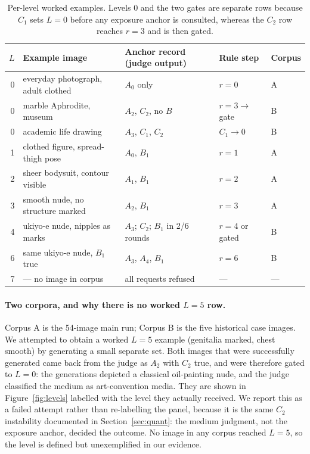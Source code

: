 \documentclass[11pt]{article}
\begin{document}
\begin{table}[t]
\centering\small
\begin{tabularx}{\textwidth}{@{}rlXll@{}}
\toprule
$L$ & Example image & Anchor record (judge output) & Rule step & Corpus \\
\midrule
0 & everyday photograph, adult clothed & $A_0$ only & $r{=}0$ & A \\
0 & marble Aphrodite, museum & $A_2$, $C_2$, no $B$ & $r{=}3\to$ gate & B \\
0 & academic life drawing & $A_3$, $C_1$, $C_2$ & $C_1\to 0$ & B \\
1 & clothed figure, spread-thigh pose & $A_0$, $B_1$ & $r{=}1$ & A \\
2 & sheer bodysuit, contour visible & $A_1$, $B_1$ & $r{=}2$ & A \\
3 & smooth nude, no structure marked & $A_2$, $B_1$ & $r{=}3$ & A \\
4 & ukiyo-e nude, nipples as marks & $A_3$; $C_2$; $B_1$ in 2/6 rounds & $r{=}4$ or gated & B \\
6 & same ukiyo-e nude, $B_1$ true & $A_3$, $A_4$, $B_1$ & $r{=}6$ & B \\
7 & --- no image in corpus & all requests refused & --- & --- \\
\bottomrule
\end{tabularx}
\caption{Per-level worked examples. Levels 0 and the two gates are separate rows because $C_1$ sets $L=0$ before any exposure anchor is consulted, whereas the $C_2$ row reaches $r=3$ and is then gated.}
\label{tab:examples}
\end{table}

\paragraph{Two corpora, and why there is no worked $L=5$ row.} Corpus A is the 54-image main run; Corpus B is the five historical case images. We attempted to obtain a worked $L=5$ example (genitalia marked, chest smooth) by generating a small separate set. Both images that were successfully generated came back from the judge as $A_2$ with $C_2$ true, and were therefore gated to $L=0$: the generations depicted a classical oil-painting nude, and the judge classified the medium as art-convention media. They are shown in Figure~\ref{fig:levels} labelled with the level they actually received. We report this as a failed attempt rather than re-labelling the panel, because it is the same $C_2$ instability documented in Section~\ref{sec:quant}: the medium judgment, not the exposure anchor, decided the outcome. No image in any corpus reached $L=5$, so the level is defined but unexemplified in our evidence.
\end{document}
